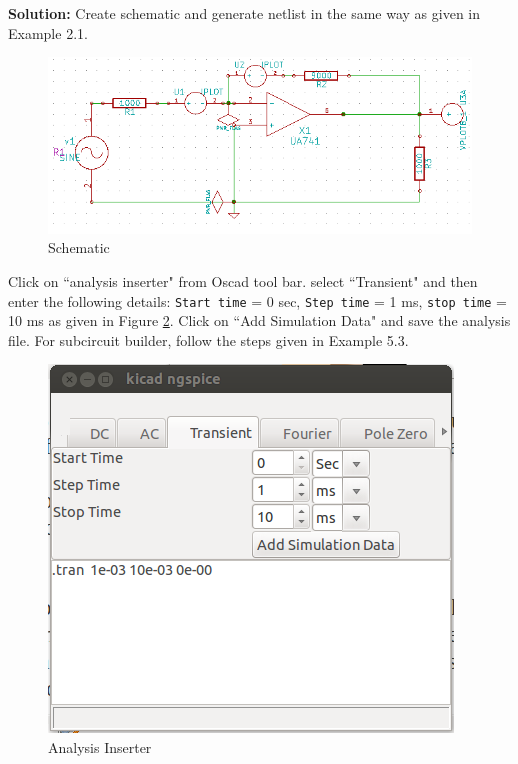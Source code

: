 \begin{enumerate}
\textbf{Solution:} Create schematic and generate netlist in the same way as given in Example 2.1.
\begin{figure}
\begin{center}
\includegraphics[width=1\linewidth]{figures/apd26.png}
\caption{Schematic}
\label{26}
\end{center}
\end{figure}

Click on ``analysis inserter" from Oscad tool bar.
select ``Transient" and then enter the following details:
{\tt Start time} = 0 sec, {\tt Step time} = 1 ms, {\tt stop time} = 10 ms as given in Figure \ref{27}. Click on ``Add Simulation Data" and save the analysis file. For subcircuit builder, follow the steps given in Example 5.3.
\begin{figure}%
\begin{center}
\includegraphics[width=1\linewidth]{figures/apd27.png}%
\caption{Analysis Inserter}
\label{27}
\end{center}
\end{figure}


\end{enumerate}
